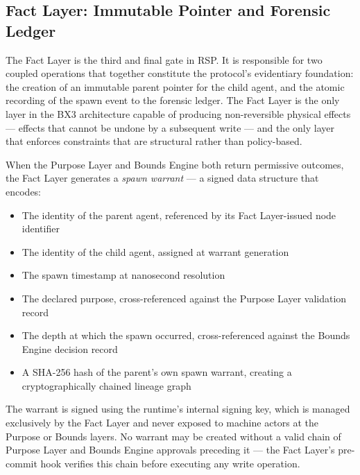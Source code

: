 \subsection{Fact Layer: Immutable Pointer and Forensic Ledger}

The Fact Layer is the third and final gate in RSP. It is responsible for two coupled operations that together constitute the protocol's evidentiary foundation: the creation of an immutable parent pointer for the child agent, and the atomic recording of the spawn event to the forensic ledger. The Fact Layer is the only layer in the BX3 architecture capable of producing non-reversible physical effects — effects that cannot be undone by a subsequent write — and the only layer that enforces constraints that are structural rather than policy-based.

When the Purpose Layer and Bounds Engine both return permissive outcomes, the Fact Layer generates a \textit{spawn warrant} — a signed data structure that encodes:

\begin{itemize}
    \itemsep0em
    \item The identity of the parent agent, referenced by its Fact Layer-issued node identifier
    \item The identity of the child agent, assigned at warrant generation
    \item The spawn timestamp at nanosecond resolution
    \item The declared purpose, cross-referenced against the Purpose Layer validation record
    \item The depth at which the spawn occurred, cross-referenced against the Bounds Engine decision record
    \item A SHA-256 hash of the parent's own spawn warrant, creating a cryptographically chained lineage graph
\end{itemize}

The warrant is signed using the runtime's internal signing key, which is managed exclusively by the Fact Layer and never exposed to machine actors at the Purpose or Bounds layers. No warrant may be created without a valid chain of Purpose Layer and Bounds Engine approvals preceding it — the Fact Layer's pre-commit hook verifies this chain before executing any write operation.

